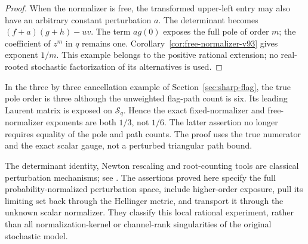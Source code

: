 \begin{proof}
When the normalizer is free, the transformed upper-left entry may
also have an arbitrary constant perturbation $a$. The determinant
becomes $(f+a)(g+h)-uv$. The term $a g(0)$ exposes the full pole
of order $m$; the coefficient of $z^m$ in $q$ remains one.
Corollary~\ref{cor:free-normalizer-v93} gives exponent $1/m$.
This example belongs to the positive rational extension; no
real-rooted stochastic factorization of its alternatives is used.
\end{proof}

In the three by three cancellation example of
Section~\ref{sec:sharp-flag}, the true pole order is three although the
unweighted flag-path count is six. Its leading Laurent matrix is
exposed on $\mathcal S_q$. Hence the exact fixed-normalizer and
free-normalizer exponents are both $1/3$, not $1/6$.
The latter assertion no longer requires equality of the pole and path
counts. The proof uses the true numerator and the exact scalar gauge,
not a perturbed triangular path bound.

The determinant identity, Newton rescaling and root-counting tools are
classical perturbation mechanisms; see \cite{GLR82,MBO97,TH,KPM09}.
The assertions proved here specify the full probability-normalized
perturbation space, include higher-order exposure, pull its limiting
set back through the Hellinger metric, and transport it through the
unknown scalar normalizer. They classify this local rational
experiment, rather than all normalization-kernel or channel-rank
singularities of the original stochastic model.
